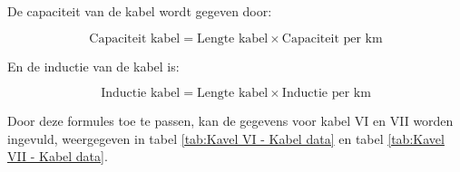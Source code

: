 De capaciteit van de kabel wordt gegeven door:

\begin{equation} \label{eq:29}
\text{{Capaciteit kabel}} = \text{{Lengte kabel}} \times \text{{Capaciteit per km}}
\end{equation} 

En de inductie van de kabel is:

\begin{equation} \label{eq:30}
\text{{Inductie kabel}} = \text{{Lengte kabel}} \times \text{{Inductie per km}}
\end{equation} 

Door deze formules toe te passen, kan de gegevens voor kabel VI en VII worden ingevuld, weergegeven in tabel \ref{tab:Kavel VI - Kabel data} en tabel \ref{tab:Kavel VII - Kabel data}.

